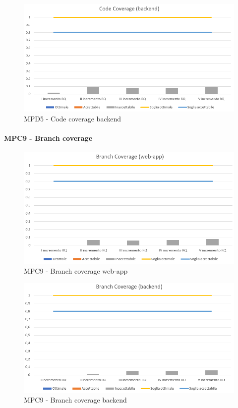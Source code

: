   \begin{figure}[h!]
    \centering
      \includegraphics[scale=0.8]{Immagini/CodeCov BE.PNG}
    \caption{MPD5 - Code coverage backend}
  \end{figure}


  \clearpage
  \paragraph{MPC9 - Branch coverage}
  \begin{figure}[h!]
    \centering
      \includegraphics[scale=0.9]{Immagini/BranchCov WA.PNG}
    \caption{MPC9 - Branch coverage web-app}
  \end{figure}

  \begin{figure}[h!]
    \centering
      \includegraphics[scale=0.9]{Immagini/BranchCov BE.PNG}
    \caption{MPC9 - Branch coverage backend}
  \end{figure}



